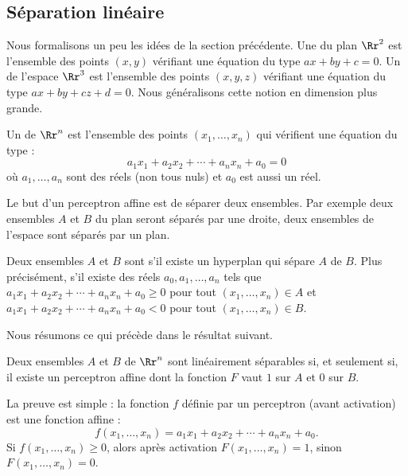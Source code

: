 \documentclass[11pt,class=report,crop=false]{standalone}
\begin{document}
\subsection{Séparation linéaire}

Nous formalisons un peu les idées de la section précédente.
Une  du plan $\Rr^2$ est l'ensemble des points $(x,y)$ vérifiant une équation du type $ax+by+c=0$. Un  de l'espace $\Rr^3$ est l'ensemble des points $(x,y,z)$ vérifiant une équation du type $ax+by+cz+d=0$.  Nous généralisons cette notion en dimension plus grande.
\begin{definition}
Un  de $\Rr^n$ est l'ensemble des points $(x_1,\ldots,x_n)$ qui vérifient une équation du type :
$$a_1 x_1 + a_2 x_2 + \cdots + a_n x_n + a_0=0$$
où $a_1,\ldots,a_n$ sont des réels (non tous nuls) et $a_0$ est aussi un réel.
\end{definition}


Le but d'un perceptron affine est de séparer deux ensembles. Par exemple deux ensembles $A$ et $B$ du plan seront séparés par une droite, deux ensembles de l'espace sont séparés par un plan.

\begin{definition}
Deux ensembles $A$ et $B$ sont  s'il existe un hyperplan qui sépare $A$ de $B$. Plus précisément, s'il existe des réels  $a_0,a_1,\ldots,a_n$ tels que $a_1 x_1 + a_2 x_2 + \cdots + a_n x_n + a_0 \ge 0$ pour tout $(x_1,\ldots,x_n) \in A$ et $a_1 x_1 + a_2 x_2 + \cdots + a_n x_n + a_0 < 0$ pour tout $(x_1,\ldots,x_n) \in B$.
\end{definition}


Nous résumons ce qui précède dans le résultat suivant.
\begin{proposition}
Deux ensembles $A$ et $B$ de $\Rr^n$ sont linéairement séparables si, et seulement si, il existe un perceptron affine dont la fonction $F$ vaut $1$ sur $A$ et $0$ sur $B$.
\end{proposition}

La preuve est simple : la fonction $f$ définie par un perceptron (avant activation) est une fonction affine :
$$f(x_1,\ldots,x_n) = a_1 x_1 + a_2 x_2 + \cdots + a_n x_n + a_0.$$
Si $f(x_1,\ldots,x_n) \ge 0$, alors après activation $F(x_1,\ldots,x_n)=1$, sinon $F(x_1,\ldots,x_n)=0$.
\end{document}
